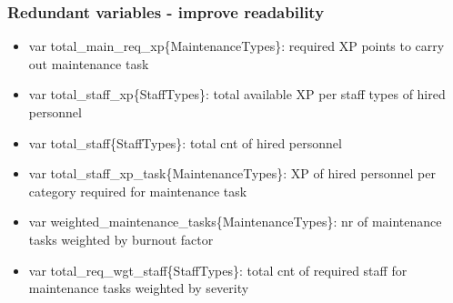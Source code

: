         \subsubsection{Redundant variables - improve readability}
          \begin{itemize}
            \item var total\_main\_req\_xp\{MaintenanceTypes\}: required XP points to carry out maintenance task
            \item var total\_staff\_xp\{StaffTypes\}: total available XP per staff types of hired personnel
            \item var total\_staff\{StaffTypes\}: total cnt of hired personnel
            \item var total\_staff\_xp\_task\{MaintenanceTypes\}: XP of hired personnel per category required for maintenance task
            \item var weighted\_maintenance\_tasks\{MaintenanceTypes\}: nr of maintenance tasks weighted by burnout factor
            \item var total\_req\_wgt\_staff\{StaffTypes\}: total cnt of required staff for maintenance tasks weighted by severity
          \end{itemize}
        
